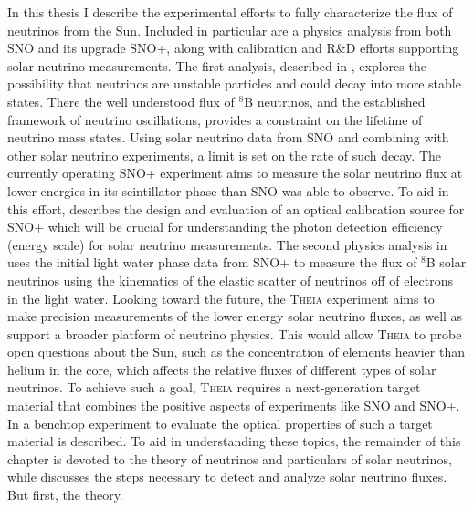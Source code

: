 In this thesis I describe the experimental efforts to fully characterize the flux of neutrinos from the Sun.
Included in particular are a physics analysis from both SNO and its upgrade SNO+, along with calibration and R\&D efforts supporting solar neutrino measurements.
The first analysis, described in , explores the possibility that neutrinos are unstable particles and could decay into more stable states.
There the well understood flux of $^8$B neutrinos, and the established framework of neutrino oscillations, provides a constraint on the lifetime of neutrino mass states.
Using solar neutrino data from SNO and combining with other solar neutrino experiments, a limit is set on the rate of such decay.
The currently operating SNO+ experiment aims to measure the solar neutrino flux at lower energies in its scintillator phase than SNO was able to observe.
To aid in this effort,  describes the design and evaluation of an optical calibration source for SNO+ which will be crucial for understanding the photon detection efficiency (energy scale) for solar neutrino measurements.
The second physics analysis in  uses the initial light water phase data from SNO+ to measure the flux of $^8$B solar neutrinos using the kinematics of the elastic scatter of neutrinos off of electrons in the light water.
Looking toward the future, the \textsc{Theia} \cite{asdc} experiment aims to make precision measurements of the lower energy solar neutrino fluxes, as well as support a broader platform of neutrino physics.
This would allow \textsc{Theia} to probe open questions about the Sun, such as the concentration of elements heavier than helium in the core, which affects the relative fluxes of different types of solar neutrinos. 
To achieve such a goal, \textsc{Theia} requires a next-generation target material that combines the positive aspects of experiments like SNO and SNO+. 
In  a benchtop experiment to evaluate the optical properties of such a target material is described.
To aid in understanding these topics, the remainder of this chapter is devoted to the theory of neutrinos and particulars of solar neutrinos, while  discusses the steps necessary to detect and analyze solar neutrino fluxes.
But first, the theory.


